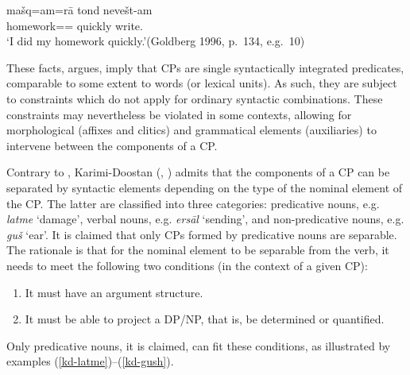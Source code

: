 \documentclass[output=paper]{langsci/langscibook}
\begin{document}
\begin{exe}
	\ex\label{goldberg-sep-do2}
	\gll ma\v{s}q=am=r\=a tond neve\v{s}t-am\\
	homework== quickly write.\\
	\glt `I did my homework quickly.'(Goldberg 1996, p.~134, e.g.~10)
\end{exe}

These facts,  \citet{Goldberg1996} argues, imply that CPs are single syntactically integrated predicates, comparable to some extent to words (or lexical units). As such, they are subject to constraints which do not apply for ordinary syntactic combinations. These constraints may nevertheless be violated in some contexts, allowing for morphological (affixes and clitics) and grammatical elements (auxiliaries)  to intervene between the components of a CP.


Contrary to \citet{Goldberg1996}, Karimi-Doostan (\citeyear{Karimi-Doostan1997}, \citeyear{Karimi-Doostan:2011}) admits that the components of a CP can be separated by syntactic elements depending on the type of the nominal element of the CP. The latter are classified into three categories: predicative nouns, e.g. \textit{latme} `damage', verbal nouns, e.g. \textit{ers\=al} `sending',  and non-predicative nouns, e.g. \textit{gu\v{s}} `ear'. It is claimed that only CPs formed by predicative nouns are separable. 
The rationale  is that for the nominal element to be separable from the verb, it needs to meet the following two conditions (in the context of a given CP): 

\begin{enumerate}\label{claim}
	\item It must have an argument structure.
	\item It must be able to project a DP/NP, that is, be determined or quantified.
	
\end{enumerate}

Only predicative nouns, it is claimed, can fit these conditions, as illustrated by examples (\ref{kd-latme})--(\ref{kd-gush}). 
\end{document}
